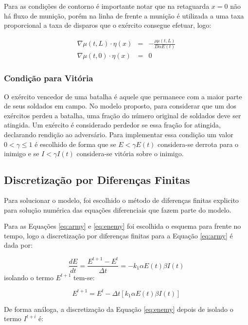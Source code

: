 \documentclass{article}
\begin{document}
Para as condições de contorno é importante notar que na retaguarda $x=0$ não há fluxo de munição, porém na linha de frente a munição é utilizada a uma taxa proporcional a taxa de disparos que o exército consegue efetuar, logo:

\begin{eqnarray}
	\nabla \mu(t,L) \cdot \eta(x) &=& -\frac{\rho \mu(t,L)}{D \alpha E(t)} \\
	\nabla \mu(t,0) \cdot \eta(x) &=& 0 \nonumber
\end{eqnarray}

\subsubsection{Condição para Vitória}

O exército vencedor de uma batalha é aquele que permanece com a maior parte de seus soldados em campo. No modelo proposto, para considerar que um dos exércitos perdeu a batalha, uma fração do número original de soldados deve ser atingida. Um exército é considerado perdedor se essa fração for atingida, declarando rendição ao adversário. Para implementar essa condição um valor $0 < \gamma \leq 1$ é escolhido de forma que se $E < \gamma E(t)$ considera-se derrota para o inimigo e se $I < \gamma I(t)$ considera-se vitória sobre o inimigo.

\subsection{Discretização por Diferenças Finitas}

Para solucionar o modelo, foi escolhido o método de diferenças finitas explicito para solução numérica das equações diferenciais que fazem parte do modelo.

Para as Equações \ref{eq:army} e \ref{eq:enemy} foi escolhida o esquema para frente no tempo, logo a discretização por diferenças finitas para a Equação \ref{eq:army} é dada por:

\begin{equation}
	\frac{dE}{dt} = \frac{E^{t+1} - E^t}{\Delta t} = -k_1 \alpha E(t) \beta I(t)
\end{equation}
isolando o termo $E^{t+1}$ tem-se:

\begin{equation}
	E^{t+1} = E^t - \Delta t \left[k_1 \alpha E(t) \beta I(t) \right]
\end{equation}

De forma análoga, a discretização da Equação \ref{eq:enemy} depois de isolado o termo $I^{t+i}$ é:
\end{document}
